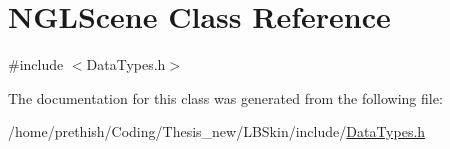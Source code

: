 \hypertarget{class_n_g_l_scene}{\section{N\-G\-L\-Scene Class Reference}
\label{class_n_g_l_scene}
}


{\ttfamily \#include $<$Data\-Types.\-h$>$}



The documentation for this class was generated from the following file\-:\begin{DoxyCompactItemize}
\item 
/home/prethish/\-Coding/\-Thesis\-\_\-new/\-L\-B\-Skin/include/\hyperlink{_data_types_8h}{Data\-Types.\-h}\end{DoxyCompactItemize}
